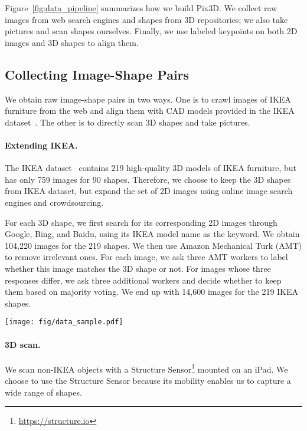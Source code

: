 \documentclass[10pt,twocolumn,letterpaper]{article}
\newcommand{\fig}[1]{Figure~\ref{#1}}
\newcommand{\myparagraph}[1]{\vspace{-14pt}\paragraph{#1}}
\newcommand{\data}{Pix3D\xspace}
\begin{document}
\fig{fig:data_pipeline} summarizes how we build \data. We collect raw images from web search engines and shapes from 3D repositories; we also take pictures and scan shapes ourselves. Finally, we use labeled keypoints on both 2D images and 3D shapes to align them. 

\subsection{Collecting Image-Shape Pairs}

We obtain raw image-shape pairs in two ways. One is to crawl images of IKEA furniture from the web and align them with CAD models provided in the IKEA dataset~\cite{Lim2013Parsing}. The other is to directly scan 3D shapes and take pictures. 

\myparagraph{Extending IKEA.}

The IKEA dataset~\cite{Lim2013Parsing} contains 219 high-quality 3D models of IKEA furniture, but has only 759 images for 90 shapes. Therefore, we choose to keep the 3D shapes from IKEA dataset, but expand the set of 2D images using online image search engines and crowdsourcing.

For each 3D shape, we first search for its corresponding 2D images through Google, Bing, and Baidu, using its IKEA model name as the keyword. We obtain 104,220 images for the 219 shapes. We then use Amazon Mechanical Turk (AMT) to remove irrelevant ones. For each image, we ask three AMT workers to label whether this image matches the 3D shape or not. For images whose three responses differ, we ask three additional workers and decide whether to keep them based on majority voting. We end up with 14,600 images for the 219 IKEA shapes.

\begin{figure*}[t]
\centering
\texttt{[image: fig/data\_sample.pdf]}
\vspace{-20pt}
\caption{Sample images and shapes in \data. From left to right: 3D shapes, 2D images, and 2D-3D alignment. Rows 1--2 show some chairs we scanned, rows 3--4 show a few IKEA objects, and rows 5--6 show some objects of other categories we scanned.}
\vspace{-15pt}
\label{fig:data_sample}
\end{figure*} 
\myparagraph{3D scan.}

We scan non-IKEA objects with a Structure Sensor\footnote{\url{https://structure.io}} mounted on an iPad. We choose to use the Structure Sensor because its mobility enables us to capture a wide range of shapes.
\end{document}
